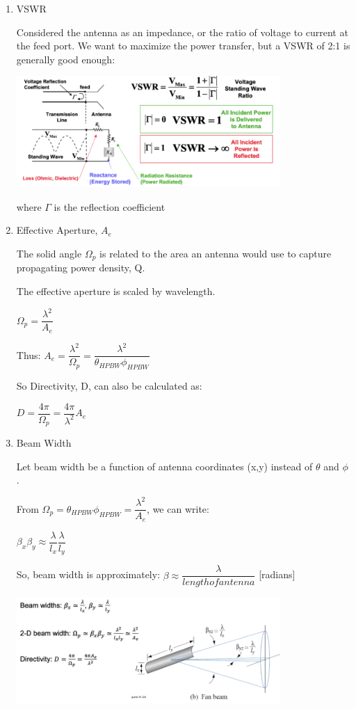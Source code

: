 \documentclass[10pt]{article}
\renewcommand{\frac}{\dfrac}
\begin{document}
\begin{enumerate}
	\item VSWR 
	
	Considered the antenna as an impedance, or the ratio of voltage to current at the feed port.
	We want to maximize the power transfer, but a VSWR of 2:1 is generally good enough:
	
	\includegraphics[width=0.79\textwidth]{figs/VSWR.png}
	
	where $\Gamma$ is the reflection coefficient
	
	
	\item Effective Aperture, $A_e$
	
	The solid angle $\Omega_p$ is related to the area an antenna would use to capture propagating power density, Q.
	
	The effective aperture is scaled by wavelength. 
	
	$\Omega_p = \frac{\lambda^2}{A_e}$
	
	Thus: $A_e = \frac{\lambda^2}{\Omega_p} = \frac{\lambda^2}{\theta_{HPBW}\phi_{HPBW}}$
	
	So Directivity, D, can also be calculated as:
	
	$D = \frac{4\pi}{\Omega_p} = \frac{4\pi}{\lambda^2}A_e$
	
	
	\item Beam Width
	
	Let beam width be a function of antenna coordinates (x,y) instead of $\theta$ and $\phi$.
	
	From $\Omega_p =  \theta_{HPBW}\phi_{HPBW} = \frac{\lambda^2}{A_e}$, we can write:
	
	$\beta_x \beta_y \approx \frac{\lambda}{l_x} \frac{\lambda}{l_y}$
	
	So, beam width is approximately: $\beta \approx \frac{\lambda}{length of antenna}$ [radians]
	
	\includegraphics[width=0.79\textwidth]{figs/beamwidth.png}
	

\end{enumerate}
\end{document}
